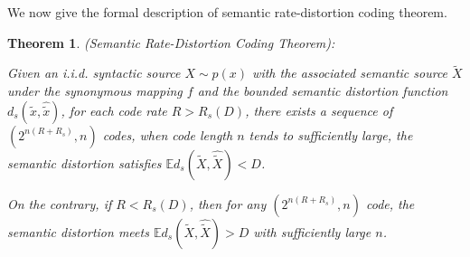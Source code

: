 \documentclass[12pt, draftclsnofoot,onecolumn]{IEEEtran}
\newtheorem{theorem}{\bf{Theorem}}
\begin{document}
We now give the formal description of semantic rate-distortion coding theorem.
\begin{theorem}\label{Sem_RDT}
(Semantic Rate-Distortion Coding Theorem):

Given an i.i.d. syntactic source $X\sim p(x)$ with the associated semantic source $\tilde{X}$ under the synonymous mapping $f$ and the bounded semantic distortion function $d_s(\tilde{x},\hat{\tilde{x}})$, for each code rate $R>R_s(D)$, there exists a sequence of $\left(2^{n(R+R_s)},n\right)$ codes, when code length $n$ tends to sufficiently large, the semantic distortion satisfies $\mathbb{E}d_s(\tilde{X},\hat{\tilde{X}})<D$.

On the contrary, if $R<R_s(D)$, then for any $\left(2^{n{(R+R_s)}},n\right)$ code, the semantic distortion meets $\mathbb{E}d_s(\tilde{X},\hat{\tilde{X}})>D$ with sufficiently large $n$.
\end{theorem}
\end{document}

